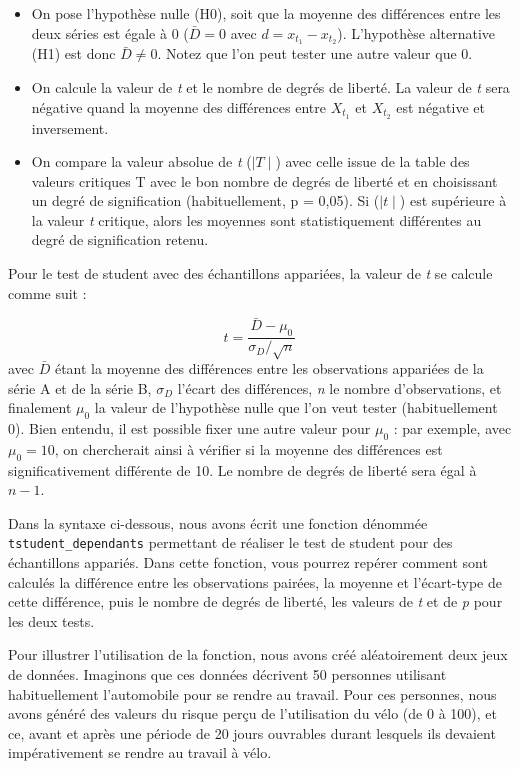\documentclass[
  11pt,
  french,
]{book}
\providecommand{\tightlist}{%
  \setlength{\itemsep}{0pt}\setlength{\parskip}{0pt}}
\begin{document}
\begin{itemize}
\tightlist
\item
  On pose l'hypothèse nulle (H0), soit que la moyenne des différences entre les deux séries est égale à 0 (\(\bar{D} = 0\) avec \(d = {x}_{t_1}- {x}_{t_2}\)). L'hypothèse alternative (H1) est donc \(\bar{D} \ne 0\). Notez que l'on peut tester une autre valeur que 0.
\item
  On calcule la valeur de \emph{t} et le nombre de degrés de liberté. La valeur de \emph{t} sera négative quand la moyenne des différences entre \({X}_{t_1}\) et \({X}_{t_2}\) est négative et inversement.
\item
  On compare la valeur absolue de \emph{t} (\(\mid T \mid\)) avec celle issue de la table des valeurs critiques T avec le bon nombre de degrés de liberté et en choisissant un degré de signification (habituellement, p = 0,05). Si (\(\mid t \mid\)) est supérieure à la valeur \emph{t} critique, alors les moyennes sont statistiquement différentes au degré de signification retenu.
\end{itemize}

Pour le test de student avec des échantillons appariées, la valeur de \emph{t} se calcule comme suit :

\[t = \frac{\bar{D}-\mu_0}{\sigma_D / \sqrt{n}}\]
avec \(\bar{D}\) étant la moyenne des différences entre les observations appariées de la série A et de la série B, \(\sigma_D\) l'écart des différences, \emph{n} le nombre d'observations, et finalement \(\mu_0\) la valeur de l'hypothèse nulle que l'on veut tester (habituellement 0). Bien entendu, il est possible fixer une autre valeur pour \(\mu_0\) : par exemple, avec \(\mu_0 = 10\), on chercherait ainsi à vérifier si la moyenne des différences est significativement différente de 10. Le nombre de degrés de liberté sera égal à \(n-1\).

Dans la syntaxe ci-dessous, nous avons écrit une fonction dénommée \texttt{tstudent\_dependants} permettant de réaliser le test de student pour des échantillons appariés. Dans cette fonction, vous pourrez repérer comment sont calculés la différence entre les observations pairées, la moyenne et l'écart-type de cette différence, puis le nombre de degrés de liberté, les valeurs de \emph{t} et de \emph{p} pour les deux tests.

Pour illustrer l'utilisation de la fonction, nous avons créé aléatoirement deux jeux de données. Imaginons que ces données décrivent 50 personnes utilisant habituellement l'automobile pour se rendre au travail. Pour ces personnes, nous avons généré des valeurs du risque perçu de l'utilisation du vélo (de 0 à 100), et ce, avant et après une période de 20 jours ouvrables durant lesquels ils devaient impérativement se rendre au travail à vélo.
\end{document}
